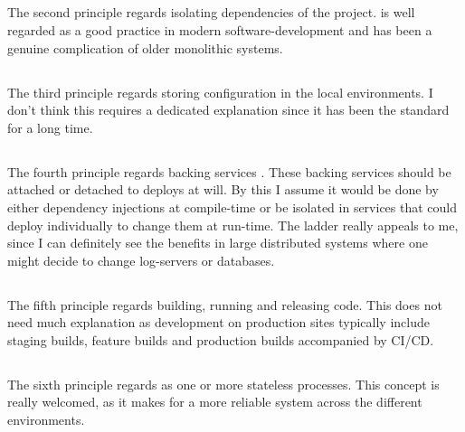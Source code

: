 \documentclass[a4paper,10pt]{article}
\begin{document}
	\subsection{}
	\cite{documentation}The second principle regards isolating dependencies of the project. 	\cite{microservices_twelve-fator_site}is well regarded as a good practice in modern software-development and has been a genuine complication of older monolithic systems.
	
	\subsection{}
	The third principle regards storing configuration in the local environments. I don't think this requires a dedicated explanation since it has been the standard for a long time.
	
	\subsection{}
	The fourth principle regards backing services \cite[A backing service is any service the app consumes over the network as part of its normal operation. Examples include datastores (such as MySQL or CouchDB), messaging/queueing systems (such as RabbitMQ or Beanstalkd)]{documentation}.
	These backing services should be attached or detached to deploys at will. By this I assume it would be done by either dependency injections at compile-time or be isolated in services that could deploy individually to change them at run-time. The ladder really appeals to me, since I can definitely see the benefits in large distributed systems where one might decide to change log-servers or databases.
	
	\subsection{}	
	The fifth principle regards building, running and releasing code. This does not need much explanation as development on production sites typically include staging builds, feature builds and production builds accompanied by CI/CD. 
	
	\subsection{}
	The sixth principle regards as one or more stateless processes. This concept is really welcomed, as it makes for a more reliable system across the different environments. \cite[For microservices, the important point in the Processes factor is that your application needs to be stateless. This makes it easy to scale a service horizontally by simply adding more instances of that service. Store any stateful data, or data that needs to be shared between instances, in a backing service.]{microservices_twelve-fator_site} 
	
\end{document}
